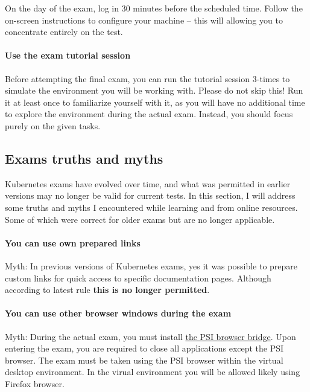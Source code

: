 On the day of the exam, log in 30 minutes before the scheduled time. Follow the on-screen instructions to configure your machine -- this will allowing you to concentrate entirely on the test.


\paragraph{Use the exam tutorial session} Before attempting the final exam, you can run the tutorial session 3-times to simulate the environment you will be working with. Please do not skip this! Run it at least once to familiarize yourself with it, as you will have no additional time to explore the environment during the actual exam. Instead, you should focus purely on the given tasks.


\subsection{Exams truths and myths}
\label{subsec:exam-truths-and-myths}

Kubernetes exams have evolved over time, and what was permitted in earlier versions may no longer be valid for current tests. In this section, I will address some truths and myths I encountered while learning and from online resources. Some of which were correct for older exams but are no longer applicable.

\paragraph{You can use own prepared links} Myth: In previous versions of Kubernetes exams, yes it was possible to prepare custom links for quick access to specific documentation pages. Although according to latest rule \textbf{this is no longer permitted}\cite{linuxfoundation-important-instructions-cka-and-ckad}.

\paragraph{You can use other browser windows during the exam} Myth: During the actual exam, you must install \href{https://www.psiexams.com/}{the PSI browser bridge}. Upon entering the exam, you are required to close all applications except the PSI browser. The exam must be taken using the PSI browser within the virtual desktop environment. In the virual environment you will be allowed likely using Firefox browser\cite{psiexams-com}\cite{linuxfoundation-important-instructions-cka-and-ckad}.

